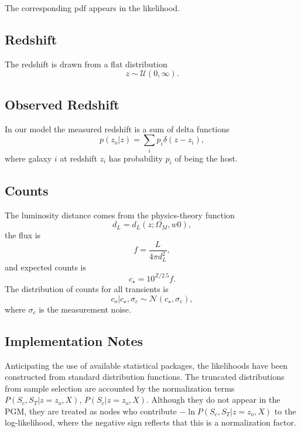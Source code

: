 \documentclass[preprint,3p]{elsarticle}
\begin{document}
The corresponding pdf appears in the likelihood.

\subsection{Redshift}
The redshift is drawn from a flat distribution
\begin{equation}
z\sim \mathcal{U}(0,\infty).
\end{equation}
%

\subsection{Observed Redshift}
In our model the measured redshift is a sum of delta functions
\begin{equation}
p(z_o|z) = \sum_i p_i \delta(z-z_i),
\end{equation}
where galaxy $i$ at
redshift $z_i$ has probability $p_i$ of being
the host.  

\subsection{Counts}
The luminosity distance comes from the physics-theory function
\begin{equation}
d_L = d_L(z; \Omega_M, w0),
\end{equation}
the flux is
\begin{equation}
f = \frac{L}{4\pi d_L^2},
\end{equation}
and expected counts is
\begin{equation}
c_\star = 10^{Z/2.5}f.
\end{equation}
The distribution of counts for all transients is 
\begin{equation}
c_o | c_\star, \sigma_c \sim \mathcal{N}(c_\star, \sigma_c),
\end{equation}
where $\sigma_c$ is the measurement noise.

\subsection{Implementation Notes}
Anticipating the use of available statistical packages, the likelihoods have been constructed
from standard distribution functions.  The truncated distributions from sample selection
are accounted by the normalization 
terms $P(S_c, S_T| z=z_o, X)$, $P(S_c| z=z_o, X)$.  Although they do not appear
in the PGM, they are treated as nodes who contribute 
$-\ln{P(S_c, S_T| z=z_o, X)}$ to the log-likelihood, where the negative sign reflects that this is a normalization
factor.
\end{document}
